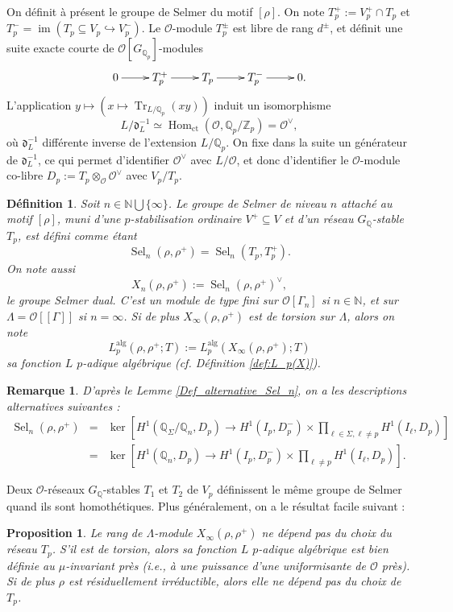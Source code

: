 \documentclass[12pt]{amsart}
\newcommand\bN{\mathbb{N}}
\newcommand\bQ{\mathbb{Q}}
\newcommand\Zp{{\mathbb{Z}_{p}}}
\newcommand\Qp{\mathbb{Q}_{p}}
\newcommand\cO{\mathcal{O}}
\newcommand\gd{\mathfrak{d}}
\newcommand{\alg}{\textrm{alg}}
\DeclareMathOperator{\Hom}{Hom}
\DeclareMathOperator{\im}{im}
\DeclareMathOperator{\Tr}{Tr}
\DeclareMathOperator{\Sel}{Sel}
\theoremstyle{defstyle}
\newtheorem{definition}[subsubsection]{Définition}
\newtheorem{remarque}[subsubsection]{Remarque}
\theoremstyle{thmstyle}
\newtheorem{proposition}[subsubsection]{Proposition}
\begin{document}
On définit à présent le groupe de Selmer du motif $[\rho]$.  On note $T_p^+ := V_p^+ \cap T_p$ et $T_p^-=\im\left(T_p \subseteq V_p \hookrightarrow V_p^-\right)$. Le $\cO$-module $T_p^\pm$ est libre de rang $d^\pm$, et définit une suite exacte courte de $\cO[G_{\Qp}]$-modules 
$$\xymatrix{
	0 \ar[r] & T_p^+ \ar[r] & T_p \ar[r] & T_p^- \ar[r] & 0.
}
$$
L'application $y \mapsto \left( x \mapsto \Tr_{L/\Qp}(xy)\right)$ induit un isomorphisme
$$L/\gd^{-1}_L \simeq \Hom_\textrm{ct}(\cO,\Qp/\Zp)=\cO^\vee,$$
où $\gd^{-1}_L$ différente inverse de l'extension $L/\Qp$. On fixe dans la suite un générateur de $\gd^{-1}_L$, ce qui permet d'identifier $\cO^\vee$ avec $L/\cO$, et donc d'identifier le $\cO$-module co-libre $D_p:=T_p \otimes_\cO \cO^\vee$ avec $V_p/T_p$. 


\begin{definition}\label{def:sel_rho}
	Soit $n \in \bN \bigcup \{\infty\}$. Le groupe de Selmer de niveau $n$ attaché au motif $[\rho]$, muni d'une $p$-stabilisation ordinaire $V^+\subseteq V$ et d'un réseau $G_{\bQ}$-stable $T_p$, est défini comme étant
	$$\Sel_n(\rho,\rho^+) = \Sel_n(T_p,T_p^+).$$
	On note aussi $$X_n(\rho,\rho^+) := \Sel_n(\rho,\rho^+)^\vee,$$ 
	le groupe Selmer dual. C'est un module de type fini sur $\cO[\Gamma_n]$ si $n\in\bN$, et sur $\Lambda=\cO[[\Gamma]]$ si $n=\infty$. Si de plus $X_\infty(\rho,\rho^+)$ est de torsion sur $\Lambda$, alors on note 
	$$L_p^{\alg}(\rho,\rho^+;T) := L_p^{\alg}(X_\infty(\rho,\rho^+);T)$$
	sa fonction $L$ $p$-adique algébrique (cf. Définition \ref{def:L_p(X)}).
\end{definition}

\begin{remarque}\label{rq:sel}
	D'après le Lemme \ref{Def_alternative_Sel_n}, on a les descriptions alternatives suivantes :
	$$\begin{array}{rcl}
	\Sel_n(\rho,\rho^+)&=& 
	\ker \left[ H^1(\bQ_\Sigma/\bQ_n,D_p) \longrightarrow H^1(I_{p},D_p^-) \times \prod_{\ell\in \Sigma, \ell \neq p} H^1(I_{\ell},D_p)  \right] \\
	&=&\ker \left[ H^1(\bQ_n,D_p) \longrightarrow H^1(I_{p},D_p^-) \times \prod_{\ell \neq p} H^1(I_{\ell},D_p)  \right].
	\end{array}$$
\end{remarque}

Deux $\cO$-réseaux $G_{\bQ}$-stables $T_1$ et $T_2$ de $V_p$ définissent le même groupe de Selmer quand ils sont homothétiques. Plus généralement, on a le résultat facile suivant :

\begin{proposition}\label{prop:dépendance_réseau}
	Le rang de  $\Lambda$-module $X_\infty(\rho,\rho^+)$ ne dépend pas du choix du réseau $T_p$. S'il est de torsion, alors sa fonction $L$ $p$-adique algébrique est bien définie au $\mu$-invariant près (\textit{i.e.}, à une puissance d'une uniformisante de $\cO$ près). Si de plus $\rho$ est résiduellement irréductible, alors elle ne dépend pas du choix de $T_p$.
\end{proposition}
\end{document}
